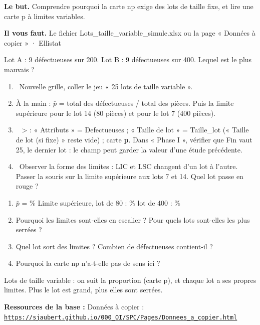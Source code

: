 \documentclass[10pt,a4paper]{article}
\begin{document}
\thispagestyle{fancy}
\begin{tcolorbox}[boite]\textbf{Le but.} Comprendre pourquoi la carte np exige des lots de taille fixe, et lire une carte p à limites variables.\par\textbf{Il vous faut.} Le fichier Lots\_taille\_variable\_simule.xlsx ou la page « Données à copier » · Ellistat\end{tcolorbox}
\begin{tcolorbox}[pred]Lot A : 9 défectueuses sur 200. Lot B : 9 défectueuses sur 400. Lequel est le plus mauvais ?\reponse\end{tcolorbox}
\begin{enumerate}[label=\textcolor{cyan}{\textbf{\arabic*.}},leftmargin=15pt,itemsep=1.5pt]
\item \tagE\ Nouvelle grille, coller le jeu « 25 lots de taille variable ».
\item À la main : $\bar p$ = total des défectueuses / total des pièces. Puis la limite supérieure pour le lot 14 (80 pièces) et pour le lot 7 (400 pièces).
\item \tagE\  >  : « Attributs » = Defectueuses ; « Taille de lot » = Taille\_lot (« Taille de lot (si fixe) » reste vide) ; carte \textbf{p}. Dans « Phase I », vérifier que Fin vaut 25, le dernier lot : le champ peut garder la valeur d'une étude précédente.
\item \tagE\ Observer la forme des limites : LIC et LSC changent d'un lot à l'autre. Passer la souris sur la limite supérieure aux lots 7 et 14. Quel lot passe en rouge ?
\end{enumerate}
\begin{enumerate}[label=\textcolor{cyan}{\textbf{Q\arabic*.}},leftmargin=22pt]
\item $\bar p$ = \champ{16mm} \% \quad Limite supérieure, lot de 80 : \champ{16mm} \% \quad lot de 400 : \champ{16mm} \%\par\vspace{5pt}
\item Pourquoi les limites sont-elles en escalier ? Pour quels lots sont-elles les plus serrées ?\reponse[2]
\item Quel lot sort des limites ? Combien de défectueuses contient-il ?\reponse[1]
\item Pourquoi la carte np n'a-t-elle pas de sens ici ?\reponse[2]
\end{enumerate}
\begin{tcolorbox}[retenir]Lots de taille variable : on suit la proportion (carte p), et chaque lot a ses propres limites. Plus le lot est grand, plus elles sont serrées.\end{tcolorbox}
\vfill{\footnotesize\color{uimm}\textbf{Ressources de la base :} Données à copier : \href{https://sjaubert.github.io/000_OI/SPC/Pages/Donnees_a_copier.html\#lotsvar}{\nolinkurl{https://sjaubert.github.io/000_OI/SPC/Pages/Donnees_a_copier.html}}}
\end{document}
